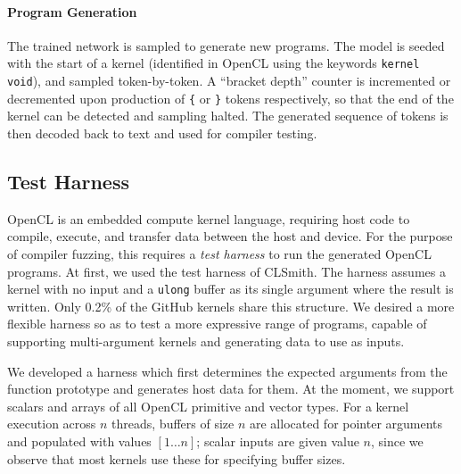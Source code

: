 \paragraph{Program Generation}

The trained network is sampled to generate new programs. The model is seeded
with the start of a kernel (identified in OpenCL using the keywords
\texttt{kernel void}), and sampled token-by-token. A ``bracket depth'' counter
is incremented or decremented upon production of \texttt{\{} or \texttt{\}}
tokens respectively, so that the end of the kernel can be detected and sampling
halted. The generated sequence of tokens is then decoded back to text and used
for compiler testing.


\subsection{Test Harness\label{sec:test-harness}}

\begin{table}[t!]
	\footnotesize %
	\centering %
	
	\caption{%
		OpenCL systems and the number of bug reports submitted to date (22\% of which have been fixed, the remainder are pending). For each system, two testbeds are created, one with compiler optimizations, the other without.%
		\vspace{-.5em}
	}
	\vspace{-1.8em}
	\label{tab:platforms}
\end{table}

OpenCL is an embedded compute kernel language, requiring host code to compile,
execute, and transfer data between the host and device. For the purpose of
compiler fuzzing, this requires a \emph{test harness} to run the generated
OpenCL programs. At first, we used the test harness of CLSmith. The harness
assumes a kernel with no input and a \texttt{ulong} buffer as its single
argument where the result is written. Only 0.2\% of the GitHub kernels share
this structure. We desired a more flexible harness so as to test a more
expressive range of programs, capable of supporting multi-argument kernels and
generating data to use as inputs.

We developed a harness which first determines the expected arguments from the
function prototype and generates host data for them. At the moment, we support
scalars and arrays of all OpenCL primitive and vector types. For a kernel
execution across $n$ threads, buffers of size $n$ are allocated for pointer
arguments and populated with values {$[1 \ldots n]$}; scalar inputs are given
value $n$, since we observe that most kernels use these for specifying buffer
sizes.

